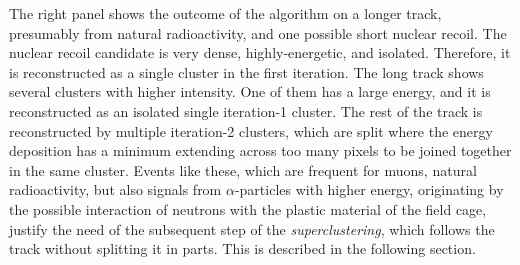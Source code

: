 The right panel shows the outcome of the \idbscan algorithm on a
longer track, presumably from natural radioactivity, and one possible
short nuclear recoil.  The nuclear recoil candidate is very dense,
highly-energetic, and isolated. Therefore, it is reconstructed as a
single cluster in the first iteration. The long track shows several
clusters with higher intensity. One of them has a large energy, and it
is reconstructed as an isolated single iteration-1 cluster. The rest
of the track is reconstructed by multiple iteration-2 clusters, which
are split where the energy deposition has a minimum extending across
too many pixels to be joined together in the same cluster. Events like
these, which are frequent for muons, natural radioactivity, but also
signals from $\alpha$-particles with higher energy, originating by the
possible interaction of neutrons with the plastic material of the
field cage, justify the need of the subsequent step of
the \textit{superclustering}, which follows the track without
splitting it in parts. This is described in the following section.
%
